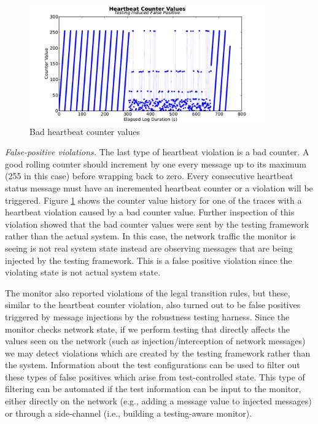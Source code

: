 \begin{figure}[t]
\centering
\includegraphics[width=4.0in]{img/hb2}
\caption{Bad heartbeat counter values \label{fig:hb_badcounter}}
\end{figure}

\textit{False-positive violations.}
The last type of heartbeat violation is a bad counter.
A good rolling counter should increment by one every message up to its maximum (255 in this case) before wrapping back to zero.
Every consecutive heartbeat status message must have an incremented heartbeat counter or a violation will be triggered. Figure \ref{fig:hb_badcounter} shows the counter value history for one of the traces with a heartbeat violation caused by a bad counter value.
%
Further inspection of this violation showed that the bad counter values were sent by the testing framework rather than the actual system. In this case, the network traffic the monitor is seeing is not real system state
instead are observing
messages that are being injected by the testing framework.
This is a false positive violation since the violating state is not actual system state.



The monitor also reported violations of the legal transition rules, but these, similar to the heartbeat counter violation, also turned out to be false positives triggered by message injections by the robustness testing harness. Since the monitor checks network state, if we perform testing that directly affects the values seen on the network (such as injection/interception of network messages) we may detect violations which are created by the testing framework rather than the system.
Information about the test configurations can be used to filter out these types of false positives which arise from test-controlled state.
This type of filtering can be automated if the test information can be input to the monitor, either directly on the network (e.g., adding a message value to injected messages) or through a side-channel (i.e., building a testing-aware monitor).
